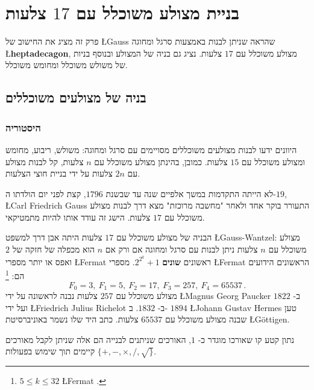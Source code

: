 



\chapter{בניית מצולע משוכלל עם 
$17$
צלעות}
\label{c.heptadecagon}


פרק זה מציג את החישוב של 
\L{Gauss}
שהראה שניתן לבנות  באמצעות סרגל ומחוגה
\L{\textbf{heptadecagon}},
מצולע משוכלל עם 
$17$
צלעות.
נציג גם בניה של המצולע ובנוסף בניות של משולש משוכלל ומחומש משוכלל.



\section{בניה של מצולעים משוכללים}


\subsection{היסטוריה}
היוונים ידעו לבנות מצולעים משוכללים מסויימים  עם סרגל ומחוגה: משולש, ריבוע, מחומש ומצולע משוכלל עם $15$ צלעות.
כמובן, בהינתן מצולע משוכלל עם
$n$
צלעות, קל לבנות מצולע עם 
$2n$
צלעות על ידי בניית חוצי הצלעות.

לא הייתה התקדמות במשך אלפיים שנה עד שבשנת
$1796$,
קצת לפני יום הולדתו ה-$19$,
\L{Carl Friedrich Gauss}
התעורר בוקר אחד ולאחר "מחשבה מרוכזת" מצא דרך לבנות מצולע משוכלל עם 
$17$
צלעות. הישג זה עודד אותו להיות מתמטיקאי.

הבניה של מצולע משוכלל עם 
$17$
צלעות היתה אבן דרך למשפט
\L{Gauss-Wantzel}:
מצולע משוכלל עם 
$n$
צלעות ניתן לבנות עם סרגל ומחוגה אם ורק אם 
$n$
הוא מכפלה של חזקה של
$2$
ואפס או יותר מספרי 
\L{Fermat}
ראשונים
\textbf{שונים}
$2^{2^k}+1$.
מספרי 
\L{Fermat}
הראשונים הידועים הם:%
\footnote{%
$5\leq k \leq 32$
\L{Fermat}
.}
\[
F_0=3,\: F_1=5,\: F_2=17,\: F_3=257,\: F_4=65537\,.
\]
מצולע משוכלל עם
$257$
צלעות נבנה לראשונה על ידי
\L{Magnus Georg Paucker}
ב-%
$1822$
ועל ידי
\L{Friedrich Julius Richelot}
ב-%
$1832$.
ב-%
$1894$
\L{Johann Gustav Hermes}
טען שבנה מצולע משוכלל עם
$65537$
צלעות.
כתב היד שלו נשמר באוניברסיטת 
\L{G\"{o}ttigen}.

נתון קטע קו שאורכו מוגדר כ-%
$1$,
האורכים שניתנים לבנייה הם אלה שניתן לקבל מאורכים קיימים תוך שימוש בפעולות 
$\{+,-,\times,/,\surd\}$.

